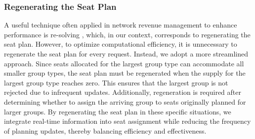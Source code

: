 


\subsubsection{Regenerating the Seat Plan}
A useful technique often applied in network revenue management to enhance performance is re-solving \citep{secomandi2008analysis, jasin2012re}, which, in our context, corresponds to regenerating the seat plan. However, to optimize computational efficiency, it is unnecessary to regenerate the seat plan for every request. Instead, we adopt a more streamlined approach. Since seats allocated for the largest group type can accommodate all smaller group types, the seat plan must be regenerated when the supply for the largest group type reaches zero. This ensures that the largest group is not rejected due to infrequent updates. Additionally, regeneration is required after determining whether to assign the arriving group to seats originally planned for larger groups. By regenerating the seat plan in these specific situations, we integrate real-time information into seat assignment while reducing the frequency of planning updates, thereby balancing efficiency and effectiveness.

